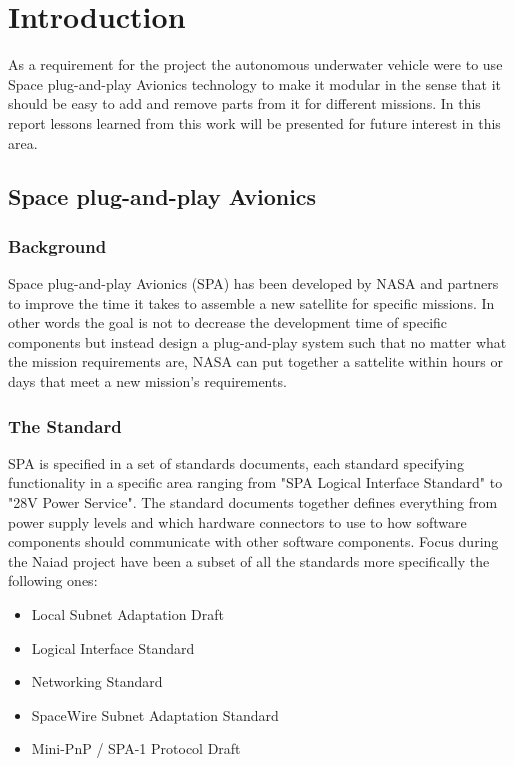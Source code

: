 \section{Introduction}\label{sec:introduction}
As a requirement for the project the autonomous underwater vehicle were to use
Space plug-and-play Avionics technology to make it modular in the sense that
it should be easy to add and remove parts from it for different missions. In
this report lessons learned from this work will be presented for future
interest in this area.

\subsection{Space plug-and-play Avionics}
\subsubsection{Background}
Space plug-and-play Avionics (SPA) has been developed by NASA and partners to
improve the time it takes to assemble a new satellite for specific missions.
In other words the goal is not to decrease the development time of specific
components but instead design a plug-and-play system such that no matter what
the mission requirements are, NASA can put together a sattelite within hours or
days that meet a new mission's requirements.

\subsubsection{The Standard}
SPA is specified in a set of standards documents, each standard specifying
functionality in a specific area ranging from "SPA Logical Interface Standard"
to "28V Power Service". The standard documents together defines everything from power
supply levels and which hardware connectors to use to how software components should
communicate with other software components. Focus during the Naiad project have
been a subset of all the standards more specifically the following ones:

\begin{itemize}
  \item Local Subnet Adaptation Draft
  \item Logical Interface Standard \cite{spa:logical_interface}
  \item Networking Standard \cite{spa:networking}
  \item SpaceWire Subnet Adaptation Standard \cite{spa:spacewire}
  \item Mini-PnP / SPA-1 Protocol Draft
\end{itemize}

